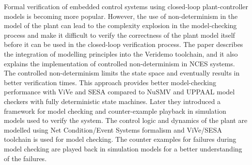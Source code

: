 \documentclass[runningheads]{llncs}
\begin{document}
Formal verification of embedded control systems using closed-loop plant-controller models is becoming more popular.  However, the use of non-determinism in the model of the plant can lead to the complexity explosion in the model-checking process and make it difficult to verify the correctness of the plant model itself before it can be used in the closed-loop verification process. The paper \cite{patil2011closed} describes the integration of modelling principles into the Veridemo toolchain, and it also explains the implementation of controlled non-determinism in NCES systems. The controlled non-determinism limits the state space and eventually results in better verification times. This approach provides better model-checking performance with ViVe and SESA compared to NuSMV and UPPAAL model checkers with fully deterministic state machines. Later they introduced \cite{patil2015counterexample}  a framework for model checking and counter-example playback in simulation models used to verify the system. The control logic and dynamics of the plant are modelled using Net Condition/Event Systems formalism and ViVe/SESA toolchain is used for model checking. The counter examples for failures during model checking are played back in simulation models for a better understanding of the failures.

\end{document}
